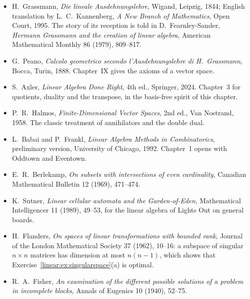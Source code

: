 \begin{itemize}
\item H.~Grassmann, \emph{Die lineale Ausdehnungslehre}, Wigand, Leipzig, 1844; English translation by L.~C.~Kannenberg,
\emph{A New Branch of Mathematics}, Open Court, 1995. The story of its reception is told in D.~Fearnley-Sander,
\emph{Hermann Grassmann and the creation of linear algebra}, American Mathematical Monthly 86 (1979), 809--817.
\item G.~Peano, \emph{Calcolo geometrico secondo l'Ausdehnungslehre di H.~Grassmann}, Bocca, Turin, 1888. Chapter~IX gives
the axioms of a vector space.
\item S.~Axler, \emph{Linear Algebra Done Right}, 4th ed., Springer, 2024. Chapter~3 for quotients, duality and the
transpose, in the basis-free spirit of this chapter.
\item P.~R.~Halmos, \emph{Finite-Dimensional Vector Spaces}, 2nd ed., Van Nostrand, 1958. The classic treatment of
annihilators and the double dual.
\item L.~Babai and P.~Frankl, \emph{Linear Algebra Methods in Combinatorics}, preliminary version, University of Chicago,
1992. Chapter~1 opens with Oddtown and Eventown.
\item E.~R.~Berlekamp, \emph{On subsets with intersections of even cardinality}, Canadian Mathematical Bulletin 12 (1969),
471--474.
\item K.~Sutner, \emph{Linear cellular automata and the Garden-of-Eden}, Mathematical Intelligencer 11 (1989), 49--53, for
the linear algebra of Lights Out on general boards.
\item H.~Flanders, \emph{On spaces of linear transformations with bounded rank}, Journal of the London Mathematical Society
37 (1962), 10--16: a subspace of singular $n\times n$ matrices has dimension at most $n(n-1)$, which shows that
Exercise~\ref{linear:ex:singularspace}(a) is optimal.
\item R.~A.~Fisher, \emph{An examination of the different possible solutions of a problem in incomplete blocks}, Annals of
Eugenics 10 (1940), 52--75.
\end{itemize}
